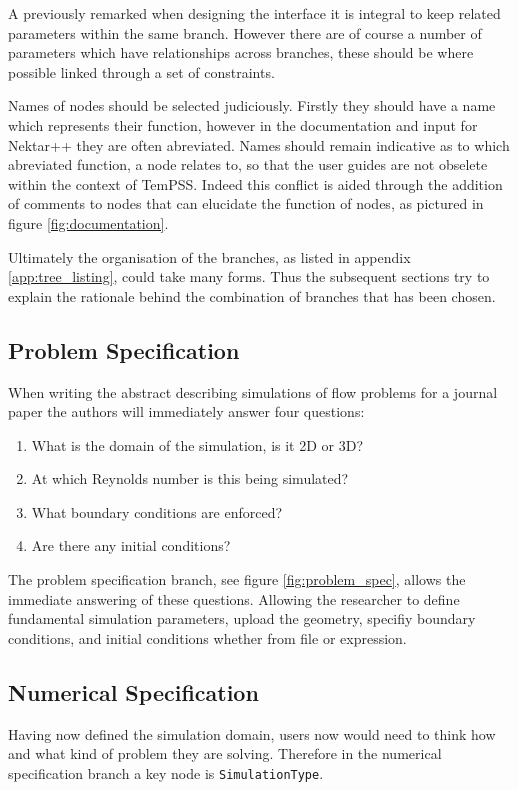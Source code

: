 \documentclass[11pt, a4paper]{report}
\begin{document}
A previously remarked when designing the interface it is integral to keep related parameters within the same branch. However there are of course a number of parameters which have relationships across branches, these should be where possible linked through a set of constraints.

Names of nodes should be selected judiciously. Firstly they should have a name which represents their function, however in the documentation and input for Nektar++ they are often abreviated. Names should remain indicative as to which abreviated function, a node relates to, so that the user guides are not obselete within the context of TemPSS. Indeed this conflict is aided through the addition of comments to nodes that can elucidate the function of nodes, as pictured in figure \ref{fig:documentation}.

Ultimately the organisation of the branches, as listed in appendix \ref{app:tree_listing}, could take many forms. Thus the subsequent sections try to explain the rationale behind the combination of branches that has been chosen.

\subsection{Problem Specification}
When writing the abstract describing simulations of flow problems for a journal paper the authors will immediately answer four questions:
\begin{enumerate}
\item What is the domain of the simulation, is it 2D or 3D?
\item At which Reynolds number is this being simulated?
\item What boundary conditions are enforced?
\item Are there any initial conditions?
\end{enumerate}

The problem specification branch, see figure \ref{fig:problem_spec}, allows the immediate answering of these questions. Allowing the researcher to define fundamental simulation parameters, upload the geometry, specifiy boundary conditions, and initial conditions whether from file or expression.	

\newpage
\subsection{Numerical Specification}
Having now defined the simulation domain, users now would need to think how and what kind of problem they are solving. Therefore in the numerical specification branch a key node is \texttt{SimulationType}.
\end{document}
